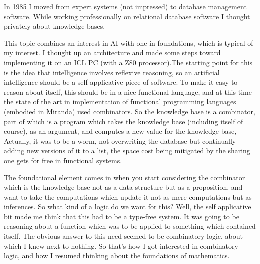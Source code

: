 In 1985 I moved from expert systems (not impressed) to database management software.
While working professionally on relational database software I thought privately about knowledge bases.

This topic combines an interest in AI with one in foundations, which is typical of my interest.
I thought up an architecture and made some steps toward implementing it on an ICL PC (with a Z80 processor).The starting point for this is the idea that intelligence involves reflexive reasoning, so an artificial intelligence should be a self applicative piece of software.
To make it easy to reason about itself, this should be in a nice functional language, and at this time the state of the art in implementation of functional programming languages (embodied in Miranda) used combinators.
So the knowledge base is a combinator, part of which is a program which takes the knowledge base (including itself of course), as an argument, and computes a new value for the knowledge base,
Actually, it was to be a worm, not overwriting the database but continually adding new versions of it to a list, the space cost being mitigated by the sharing one gets for free in functional systems.

The foundational element comes in when you start considering the combinator which is the knowledge base not as a data structure but as a proposition, and want to take the computations which update it not as mere computations but as inferences.
So what kind of a logic do we want for this?
Well, the self applicative bit made me think that this had to be a type-free system.
It was going to be reasoning about a function which was to be applied to something which contained itself.
The obvious answer to this need seemed to be combinatory logic, about which I knew next to nothing.
So that's how I got interested in combinatory logic, and how I resumed thinking about the foundations of mathematics.

